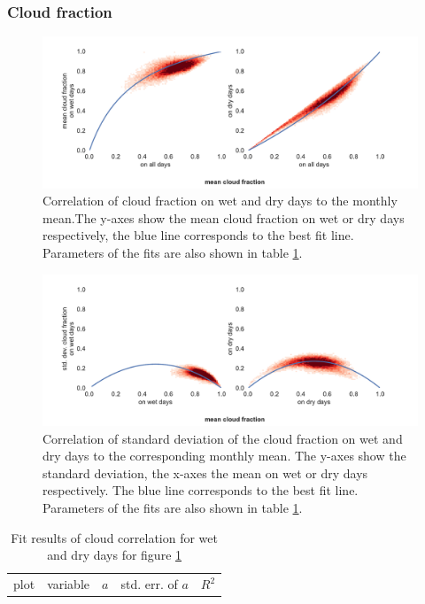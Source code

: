 \begin{refsection}
\subsubsection{Cloud fraction}
\begin{figure}
	\includegraphics[width=12cm]{gwgen-figures/f08.pdf}
	\caption[Correlation of cloud fraction on wet and dry days to the monthly mean]{Correlation of cloud fraction on wet and dry days to the monthly mean.The y-axes show the mean cloud fraction on wet or dry days respectively, the blue line corresponds to the best fit line. Parameters of the fits are also shown in table \ref{tab:cloud-corr}.}
	\label{fig:cloud}
\end{figure}
\begin{figure}
	\includegraphics[width=12cm]{gwgen-figures/f09.pdf}
	\caption[Correlation of standard deviation of cloud fraction to the monthly mean]{Correlation of standard deviation of the cloud fraction on wet and dry days to the corresponding monthly mean. The y-axes show the standard deviation, the x-axes the mean on wet or dry days respectively. The blue line corresponds to the best fit line. Parameters of the fits are also shown in table \ref{tab:cloud-corr}.}
	\label{fig:cloud_sd}
\end{figure}
\begin{table}[t]
	\caption[Fit results of cloud correlation for wet and dry days.]{Fit results of cloud correlation for wet and dry days for figure \ref{fig:cloud}}
	\label{tab:cloud-corr}
	\begin{tabular}{llccc}
		\tophline
		plot &                         variable &     $a$ & std. err. of $a$ &  $R^2$ \\

\end{tabular}
\end{table}
\end{refsection}
